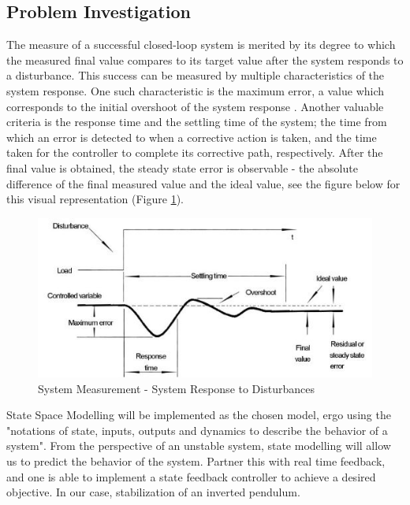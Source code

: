 \documentclass[12pt]{article}
\begin{document}
\subsection{Problem Investigation}
The measure of a successful closed-loop system is merited by its degree to which the measured final value compares to its target value after the system responds to a disturbance. This success can be measured by multiple characteristics of the system response. One such characteristic is the maximum error, a value which corresponds to the initial overshoot of the system response \cite{OCLoop}. Another valuable criteria is the response time and the settling time of the  system; the time from which an error is detected to when a corrective action is taken, and the time taken for the controller to complete its corrective path, respectively. After the final value is obtained, the steady state error is observable - the absolute difference of the final measured value and the ideal value, see the figure below for this visual representation (Figure \ref{fig:Resp}).
\begin{figure}[H]
    \centering
    \includegraphics[width=.7\linewidth]{figures/System response.JPG}
    \caption{System Measurement - System Response to Disturbances  \cite{OCLoop}}
    \label{fig:Resp}
\end{figure}

State Space Modelling will be implemented as the chosen model, ergo using the "notations of state, inputs, outputs and dynamics to describe the behavior of a system"\cite{StateSpace}. From the perspective of an unstable system, state modelling will allow us to predict the behavior of the system. Partner this with real time feedback, and one is able to implement a state feedback controller to achieve a desired objective. In our case, stabilization of an inverted pendulum.
\end{document}
